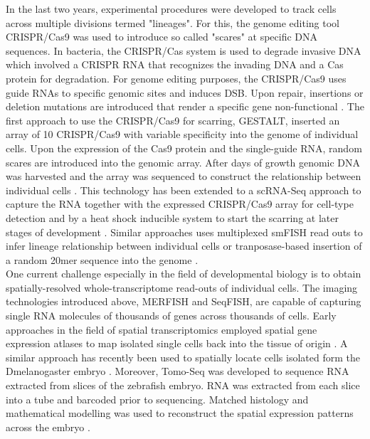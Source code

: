 In the last two years, experimental procedures were developed to track cells across multiple divisions termed "lineages". For this, the genome editing tool \gls{CRISPR}/\gls{Cas9} \citep{Jinek2012} was used to introduce so called "scares" at specific DNA sequences. In bacteria, the CRISPR/Cas system is used to degrade invasive DNA which involved a CRISPR RNA that recognizes the invading DNA and a Cas protein for degradation. For genome editing purposes, the \gls{CRISPR}/\gls{Cas9} uses guide RNAs to specific genomic sites and induces \gls{DSB}. Upon repair, insertions or deletion mutations are introduced that render a specific gene non-functional \citep{Zhang2014c}. The first approach to use the 	\gls{CRISPR}/\gls{Cas9} for scarring, \gls{GESTALT}, inserted an array of 10 \gls{CRISPR}/\gls{Cas9} with variable specificity into the genome of individual cells. Upon the expression of the Cas9 protein and the single-guide RNA, random scares are introduced into the genomic array. After days of growth genomic DNA was harvested and the array was sequenced to construct the relationship between individual cells \citep{McKenna2016}. This technology has been extended to a scRNA-Seq approach to capture the RNA together with the expressed \gls{CRISPR}/\gls{Cas9} array for cell-type detection and by a heat shock inducible system to start the scarring at later stages of development \citep{Raj2018}. Similar approaches uses multiplexed smFISH read outs to infer lineage relationship between individual cells \citep{Frieda2017} or tranposase-based insertion of a random 20mer sequence into the genome \citep{Wagner2018}.\\

One current challenge especially in the field of developmental biology is to obtain spatially-resolved whole-transcriptome read-outs of individual cells. The imaging technologies introduced above, MERFISH and SeqFISH, are capable of capturing single RNA molecules of thousands of genes across thousands of cells. Early approaches in the field of spatial transcriptomics employed spatial gene expression atlases to map isolated single cells back into the tissue of origin \citep{Achim2015a, Satija2015a}. A similar approach has recently been used to spatially locate cells isolated form the \gls{Dmelanogaster} embryo . Moreover, Tomo-Seq was developed to sequence RNA extracted from slices of the zebrafish embryo. RNA was extracted from each slice into a tube and barcoded prior to sequencing. Matched histology and mathematical modelling was used to reconstruct the spatial expression patterns across the embryo \citep{Junker2014a}.


